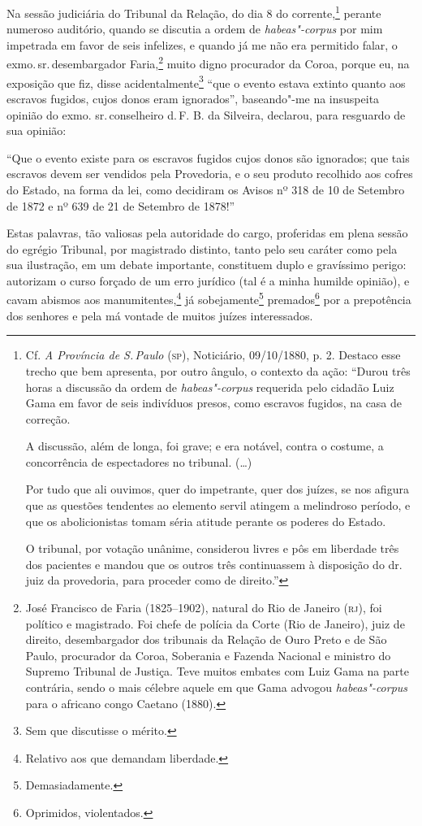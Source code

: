 Na sessão judiciária do Tribunal da Relação, do dia 8 do
corrente,\footnote{Cf. \emph{A Província de S.\,Paulo} (\textsc{sp}), Noticiário,
  09/10/1880, p. 2. Destaco esse trecho que bem apresenta, por outro
  ângulo, o contexto da ação: ``Durou três horas a discussão da ordem de
  \emph{habeas"-corpus} requerida pelo cidadão Luiz Gama em favor de seis
  indivíduos presos, como escravos fugidos, na casa de correção.

  A discussão, além de longa, foi grave; e era notável, contra o
  costume, a concorrência de espectadores no tribunal. (\ldots{})

  Por tudo que ali ouvimos, quer do impetrante, quer dos juízes, se nos
  afigura que as questões tendentes ao elemento servil atingem a
  melindroso período, e que os abolicionistas tomam séria atitude
  perante os poderes do Estado.

  O tribunal, por votação unânime, considerou livres e pôs em liberdade
  três dos pacientes e mandou que os outros três continuassem à
  disposição do dr.\,juiz da provedoria, para proceder como de direito.''}
perante numeroso auditório, quando se discutia a ordem de
\emph{habeas"-corpus} por mim impetrada em favor de seis infelizes, e
quando já me não era permitido falar, o exmo.\,sr.\,desembargador
Faria,\footnote{José Francisco de Faria (1825--1902), natural do Rio de
  Janeiro (\textsc{rj}), foi político e magistrado. Foi chefe de polícia da Corte
  (Rio de Janeiro), juiz de direito, desembargador dos tribunais da
  Relação de Ouro Preto e de São Paulo, procurador da Coroa, Soberania e
  Fazenda Nacional e ministro do Supremo Tribunal de Justiça. Teve
  muitos embates com Luiz Gama na parte contrária, sendo o mais célebre
  aquele em que Gama advogou \emph{habeas"-corpus} para o africano congo
  Caetano (1880).} muito digno procurador da Coroa, porque eu, na
exposição que fiz, disse acidentalmente\footnote{Sem que discutisse o
  mérito.} ``que o evento estava extinto quanto aos escravos fugidos,
cujos donos eram ignorados'', baseando"-me na insuspeita opinião do exmo.
sr.\,conselheiro d.\,F. B. da Silveira, declarou, para resguardo de sua
opinião:

``Que o evento existe para os escravos fugidos cujos donos são ignorados;
que tais escravos devem ser vendidos pela Provedoria, e o seu produto
recolhido aos cofres do Estado, na forma da lei, como decidiram os
Avisos nº 318 de 10 de Setembro de 1872 e nº 639 de 21 de Setembro de
1878!''

Estas palavras, tão valiosas pela autoridade do cargo, proferidas em
plena sessão do egrégio Tribunal, por magistrado distinto, tanto pelo
seu caráter como pela sua ilustração, em um debate importante,
constituem duplo e gravíssimo perigo: autorizam o curso forçado de um
erro jurídico (tal é a minha humilde opinião), e cavam abismos aos
manumitentes,\footnote{Relativo aos que demandam liberdade.} já
sobejamente\footnote{Demasiadamente.} premados\footnote{Oprimidos,
  violentados.} por a
prepotência dos senhores e pela má vontade de muitos juízes
interessados.

